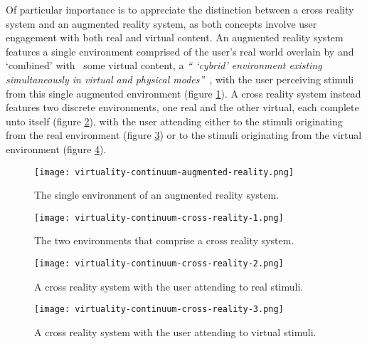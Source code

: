 Of particular importance is to appreciate the distinction between a cross reality system and an augmented reality system\avxrfootnote{}, as both concepts involve user engagement with both real and virtual content. An augmented reality system features a single environment comprised of the user's real world overlain by and `combined' with~\cite{Billinghurst2014} some virtual content, a \textit{`` `cybrid' environment existing simultaneously in virtual and physical modes''}~\cite{Lichty2014}, with the user perceiving stimuli from this single augmented environment (figure \ref{virtuality-continuum-augmented-reality}). A cross reality system instead features two discrete environments, one real and the other virtual, each complete unto itself (figure \ref{virtuality-continuum-cross-reality-1}), with the user attending either to the stimuli originating from the real environment (figure \ref{virtuality-continuum-cross-reality-2}) or to the stimuli originating from the virtual environment (figure \ref{virtuality-continuum-cross-reality-3}).

\begin{figure}
	\begin{center}
		\texttt{[image: virtuality-continuum-augmented-reality.png]}
		\caption{The single environment of an augmented reality system.}
		\label{virtuality-continuum-augmented-reality}
	\end{center}
\end{figure}

\begin{figure}
	\begin{center}
		\texttt{[image: virtuality-continuum-cross-reality-1.png]}
		\caption{The two environments that comprise a cross reality system.}
		\label{virtuality-continuum-cross-reality-1}
	\end{center}
\end{figure}

\begin{figure}
	\begin{center}
		\texttt{[image: virtuality-continuum-cross-reality-2.png]}
		\caption{A cross reality system with the user attending to real stimuli.}
		\label{virtuality-continuum-cross-reality-2}
	\end{center}
\end{figure}

\begin{figure}
	\begin{center}
		\texttt{[image: virtuality-continuum-cross-reality-3.png]}
		\caption{A cross reality system with the user attending to virtual stimuli.}
		\label{virtuality-continuum-cross-reality-3}
	\end{center}
\end{figure}

